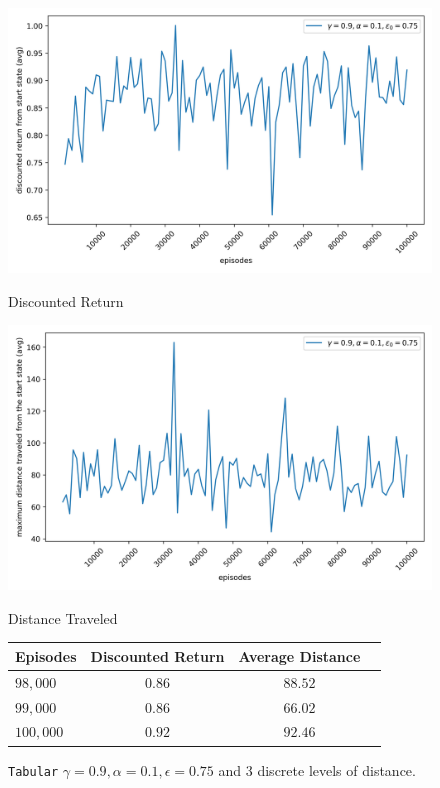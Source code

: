 \begin{figure}[H]
    \centering
    \begin{minipage}{0.49\linewidth}
        \centering
        \includegraphics[width=\linewidth]{plots/part1-e.2-rewards.png}
        \caption{Discounted Return}
        
    \end{minipage}
    \hfill
    \begin{minipage}{0.49\linewidth}
        \centering
        \includegraphics[width=\linewidth]{plots/part1-e.2-distances.png}
        \caption{Distance Traveled}
    \end{minipage}

    \vspace{1em}
    \begin{minipage}{\linewidth}
        \centering
        \begin{tabular}{lccc}
            \hline
            Episodes & Discounted Return & Average Distance \\
            \hline
            $98,000$ & $0.86$ & $88.52$ \\
            $99,000$ & $0.86$ & $66.02$ \\
            $100,000$ & $0.92$ & $92.46$ \\
            \hline
        \end{tabular}
        \caption{\texttt{Tabular} $\gamma = 0.9, \alpha = 0.1, \epsilon = 0.75$ and $3$ discrete levels of distance.}
    \end{minipage}
     \label{fig:part1-e2}
\end{figure}
